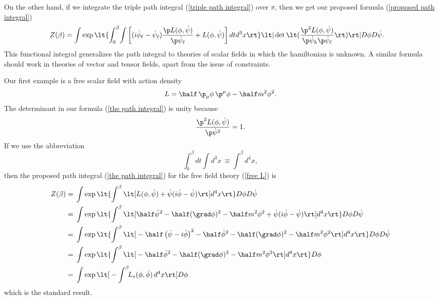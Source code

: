 \documentclass[prd,preprint,floatfix,showpacs]{revtex4-1}
\begin{document}
On the other hand, if we integrate
the triple path integral (\ref {triple path integral})
over \( \pi \), then we get our proposed
formula (\ref {proposed path integral})
\begin{equation}
   \begin{split}
Z(\beta) = {}&
\! \int \exp \lt\{ \int_0^\beta \! \int \left[
( i \dot \phi_\ell - \dot \psi_\ell ) 
\frac{ \p  L(\phi, \dot \psi) }
{ \p \dot \psi_\ell }
+ L(\phi, \dot \psi) \right]
dt d^3x \rt\}
\lt| \det \lt( \frac{ \p^2  L(\phi, \dot \psi) }
{ \p \dot \psi_k \p \dot \psi_\ell }  \rt) \rt|
D\phi D\dot\psi .
\label {the path integral}
   \end{split}
\end{equation}
This functional integral generalizes 
the path integral to theories of scalar fields
in which the hamiltonian is unknown.
A similar formula should work in
theories of vector and tensor fields,
apart from the issue of constraints.
\par
Our first example is a free scalar field
with action density
\begin{equation}
L = \half \, \p_\mu \phi \, \p^\mu \phi 
- \half m^2 \phi^2 .
\label {free L}
\end{equation}
The determinant in our formula
(\ref {the path integral}) is unity because
\begin{equation}
\frac{ \p^2  L(\phi, \dot \psi) }
{ \p \dot \psi^2 } = 1 .
\end{equation}
If we use the abbreviation
\begin{equation}
\int_0^\beta dt \! \int d^3x \, \equiv \int^\beta d^4x,
\label {we will use the compact notation}
\end{equation}
then the proposed path integral
(\ref {the path integral}) 
for the free field theory (\ref {free L}) is
\begin{equation}
   \begin{split}
Z(\beta) = {}&
\int \exp \lt\{ \int^\beta \lt[  L(\phi, \dot \psi) 
+ \dot \psi ( i \dot \phi - \dot \psi )
\rt] d^4x \rt\}  D\phi D\dot \psi \\
= {}&
\int \exp \lt\{ \int^\beta \lt[  
\half \dot \psi^2 - \half (\grad \phi)^2 
- \half m^2 \phi^2 
+ \dot \psi ( i \dot \phi - \dot \psi )
\rt] d^4x \rt\}  D\phi D\dot \psi \\
= {}&
\int \exp \lt\{ \int^\beta \lt[ {} 
- \half \left( \dot \psi - i \dot \phi \right)^2
- \half \dot \phi^2 
- \half (\grad \phi)^2 
- \half m^2 \phi^2 
\rt] d^4x \rt\}  D\phi D\dot \psi \\
= {}&
\int \exp \lt\{ \int^\beta \lt[ {} - \half \dot \phi^2
- \half (\grad \phi)^2 
- \half m^2 \phi^2 
\rt] d^4x \rt\}  D\phi \\
= {}&\int \exp \lt[ {} - \int^\beta \!\!
L_e(\phi, \dot \phi) \, d^4x \rt]  D\phi 
\label {free path integral}
   \end{split}
\end{equation}
which is the standard result.
\end{document}
